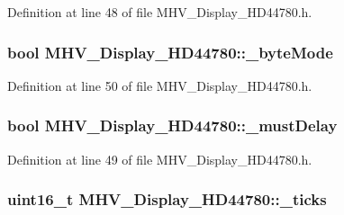 \-Definition at line 48 of file \-M\-H\-V\-\_\-\-Display\-\_\-\-H\-D44780.\-h.

\hypertarget{class_m_h_v___display___h_d44780_a122793e8b5dc3a2f0ad1eeab407ece4b}{
\subsubsection[{\-\_\-byte\-Mode}]{\setlength{\rightskip}{0pt plus 5cm}bool {\bf \-M\-H\-V\-\_\-\-Display\-\_\-\-H\-D44780\-::\-\_\-byte\-Mode}}}
\label{class_m_h_v___display___h_d44780_a122793e8b5dc3a2f0ad1eeab407ece4b}


\-Definition at line 50 of file \-M\-H\-V\-\_\-\-Display\-\_\-\-H\-D44780.\-h.

\hypertarget{class_m_h_v___display___h_d44780_af0f2603c415f13dedfe6e9147d40b06f}{
\subsubsection[{\-\_\-must\-Delay}]{\setlength{\rightskip}{0pt plus 5cm}bool {\bf \-M\-H\-V\-\_\-\-Display\-\_\-\-H\-D44780\-::\-\_\-must\-Delay}}}
\label{class_m_h_v___display___h_d44780_af0f2603c415f13dedfe6e9147d40b06f}


\-Definition at line 49 of file \-M\-H\-V\-\_\-\-Display\-\_\-\-H\-D44780.\-h.

\hypertarget{class_m_h_v___display___h_d44780_a5dac9510b7fc9e79e5fbf8b07eeaa661}{
\subsubsection[{\-\_\-ticks}]{\setlength{\rightskip}{0pt plus 5cm}uint16\-\_\-t {\bf \-M\-H\-V\-\_\-\-Display\-\_\-\-H\-D44780\-::\-\_\-ticks}}}
\label{class_m_h_v___display___h_d44780_a5dac9510b7fc9e79e5fbf8b07eeaa661}


